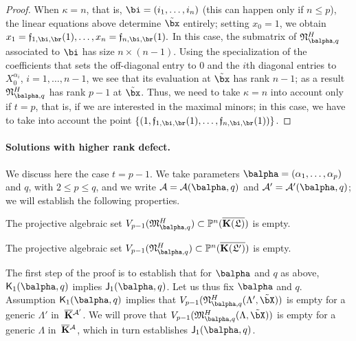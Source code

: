 \documentclass[12pt]{article}
\begin{document}
\begin{proof}
  When $\kappa=n$, that is, $\bi=(i_1,\dots,i_n)$ (this can happen
  only if $n \le p$), the linear equations above determine $\tilde\bx$
  entirely; setting $x_0=1$, we obtain
  $x_{1}=\mathfrak{f}_{1,\bi,\br}(1),\dots,x_{n}=\mathfrak{f}_{n,\bi,\br}(1).$
  In this case, the submatrix of $\mathfrak{N}^H_{\balpha,q}$
  associated to $\bi$ has size $n \times (n-1)$. Using the
  specialization of the coefficients that sets the off-diagonal entry
  to $0$ and the $i$th diagonal entries to $X_0^{\alpha_i}$,
  $i=1,\dots,n-1$, we see that its evaluation at $\tilde\bx$ has rank
  $n-1$; as a result $\mathfrak{N}^H_{\balpha,q}$ has rank $p-1$ at
  $\tilde \bx$. Thus, we need to take $\kappa=n$ into account only if
  $t=p$, that is, if we are interested in the maximal minors; in this
  case, we have to take into account the point $\left \{
  (1,\mathfrak{f}_{1,\bi,\br}(1),\dots,\mathfrak{f}_{n,\bi,\br}(1))\right
  \}$.
\end{proof}


\paragraph{Solutions with higher rank defect.} 
We discuss here the case $t=p-1$.  We take parameters
$\balpha=(\alpha_1,\dots,\alpha_p)$ and $q$, with $2 \le p \le q$, and
we write ${\cal A}={\cal A}(\balpha,q)$ and ${\cal A}'={\cal A}'(\balpha,q)$; we will establish
the following properties.
\begin{description}[leftmargin=*]
\item[$\assI_1(\balpha,q).$] The projective algebraic set
  $V_{p-1}(\mathfrak{M}^H_{\balpha,q})\subset\P^n(\KKGbar)$ is empty.
\item[$\assJ_1(\balpha,q).$] The projective algebraic set
  $V_{p-1}(\mathfrak{N}^H_{\balpha,q})\subset\P^n(\KKGpbar)$ is empty.
\end{description}
The first step of the proof is to establish that for $\balpha$ and $q$
as above, $\assJ_1(\balpha,q)$ implies $\assI_1(\balpha,q)$. Let us
thus fix $\balpha$ and $q$.  Assumption $\assJ_1(\balpha,q)$ implies
that $V_{p-1}(\mathfrak{N}^H_{\balpha,q}(\Lambda',\tilde\bX))$ is
empty for a generic $\Lambda'$ in~$\overline{\mathbf{K}}{}^{{\cal A}'}$.  We will prove that
$V_{p-1}(\mathfrak{M}^H_{\balpha,q}(\Lambda,\tilde\bX))$ is empty for
a generic $\Lambda$ in~$\overline{\mathbf{K}}{}^{\cal A}$, which in turn establishes
$\assI_1(\balpha,q)$.
\end{document}
